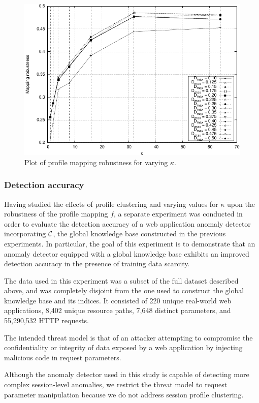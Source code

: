 \begin{figure}[t]
  \centering
  \includegraphics[width=.9\textwidth]{figures/web/longtail/fig_robustness}
  \caption{Plot of profile mapping robustness for varying $\kappa$.}
  \label{fig:robustness}
\end{figure}

\subsubsection{Detection accuracy}
\label{web:longtail:eval:detection}
Having studied the effects of profile clustering and varying values
for $\kappa$ upon the robustness of the profile mapping $f$, a
separate experiment was conducted in order to evaluate the detection
accuracy of a web application anomaly detector incorporating $\mathcal{C}$,
the global knowledge base constructed in the previous experiments. In
particular, the goal of this experiment is to demonstrate that an
anomaly detector equipped with a global knowledge base exhibits an
improved detection accuracy in the presence of training data scarcity.

The data used in this experiment was a subset of the full dataset
described above, and was completely disjoint from the one used to
construct the global knowledge base and its indices.  It consisted of
220 unique real-world web applications, 8,402 unique resource paths,
7,648 distinct parameters, and 55,290,532 \ac{HTTP}
requests.

The intended threat model is that of an attacker attempting to
compromise the confidentiality or integrity of data exposed by a web
application by injecting malicious code in request parameters.

\begin{note}
  Although the anomaly detector used in this study is capable of
  detecting more complex session-level anomalies, we restrict the
  threat model to request parameter manipulation because we do not
  address session profile clustering.
\end{note}


